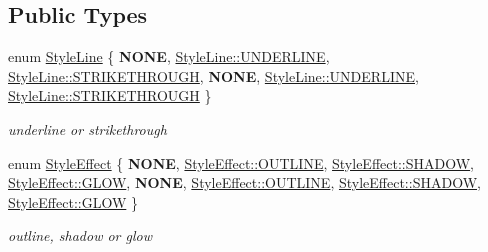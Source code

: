 \subsection*{Public Types}
\begin{DoxyCompactItemize}
\item 
enum \hyperlink{classMyXMLVisitor_a75a0b4e2723f798f35a0941ddba7c5a7}{Style\+Line} \{ \newline
{\bfseries N\+O\+NE}, 
\hyperlink{classMyXMLVisitor_a75a0b4e2723f798f35a0941ddba7c5a7a0086c73c90c261db630b4dc8aea09bcf}{Style\+Line\+::\+U\+N\+D\+E\+R\+L\+I\+NE}, 
\hyperlink{classMyXMLVisitor_a75a0b4e2723f798f35a0941ddba7c5a7aad166989fa2b7da7d238b3e7105c64f8}{Style\+Line\+::\+S\+T\+R\+I\+K\+E\+T\+H\+R\+O\+U\+GH}, 
{\bfseries N\+O\+NE}, 
\newline
\hyperlink{classMyXMLVisitor_a75a0b4e2723f798f35a0941ddba7c5a7a0086c73c90c261db630b4dc8aea09bcf}{Style\+Line\+::\+U\+N\+D\+E\+R\+L\+I\+NE}, 
\hyperlink{classMyXMLVisitor_a75a0b4e2723f798f35a0941ddba7c5a7aad166989fa2b7da7d238b3e7105c64f8}{Style\+Line\+::\+S\+T\+R\+I\+K\+E\+T\+H\+R\+O\+U\+GH}
 \}\begin{DoxyCompactList}\small\item\em underline or strikethrough \end{DoxyCompactList}
\item 
enum \hyperlink{classMyXMLVisitor_a7f84d816c0b481e9cb35884996af6c2c}{Style\+Effect} \{ \newline
{\bfseries N\+O\+NE}, 
\hyperlink{classMyXMLVisitor_a7f84d816c0b481e9cb35884996af6c2ca6a656275b77dd69c1cc1f49c58859151}{Style\+Effect\+::\+O\+U\+T\+L\+I\+NE}, 
\hyperlink{classMyXMLVisitor_a7f84d816c0b481e9cb35884996af6c2ca8160fba05a5a291372a94bc22b55f62b}{Style\+Effect\+::\+S\+H\+A\+D\+OW}, 
\hyperlink{classMyXMLVisitor_a7f84d816c0b481e9cb35884996af6c2cac1f6db55d4aa7ba3eda97848763b6489}{Style\+Effect\+::\+G\+L\+OW}, 
\newline
{\bfseries N\+O\+NE}, 
\hyperlink{classMyXMLVisitor_a7f84d816c0b481e9cb35884996af6c2ca6a656275b77dd69c1cc1f49c58859151}{Style\+Effect\+::\+O\+U\+T\+L\+I\+NE}, 
\hyperlink{classMyXMLVisitor_a7f84d816c0b481e9cb35884996af6c2ca8160fba05a5a291372a94bc22b55f62b}{Style\+Effect\+::\+S\+H\+A\+D\+OW}, 
\hyperlink{classMyXMLVisitor_a7f84d816c0b481e9cb35884996af6c2cac1f6db55d4aa7ba3eda97848763b6489}{Style\+Effect\+::\+G\+L\+OW}
 \}\begin{DoxyCompactList}\small\item\em outline, shadow or glow \end{DoxyCompactList}

\end{DoxyCompactItemize}
